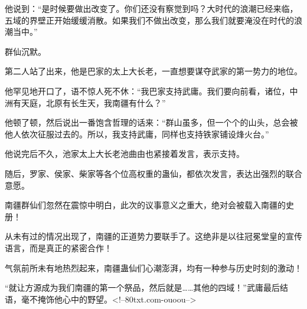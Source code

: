 \begin{this_body}
他说到：“是时候要做出改变了。你们还没有察觉到吗？大时代的浪潮已经来临，五域的界壁正开始缓缓消散。如果我们不做出改变，那么我们就要淹没在时代的浪潮当中。”

群仙沉默。

第二人站了出来，他是巴家的太上大长老，一直想要谋夺武家的第一势力的地位。

他罕见地开口了，语不惊人死不休：“我巴家支持武庸。我们要向前看，诸位，中洲有天庭，北原有长生天，我南疆有什么？”

他顿了顿，然后说出一番饱含哲理的话来：“群山虽多，但一个个的山头，总会被他人依次征服过去的。所以，我支持武庸，同样也支持铁家铺设烽火台。”

他说完后不久，池家太上大长老池曲由也紧接着发言，表示支持。

随后，罗家、侯家、柴家等各个位高权重的蛊仙，都依次发言，表达出强烈的联合意愿。

南疆群仙们忽然在震惊中明白，此次的议事意义之重大，绝对会被载入南疆的史册！

从未有过的情况出现了，南疆的正道势力要联手了。这绝非是以往冠冕堂皇的宣传语言，而是真正的紧密合作！

气氛前所未有地热烈起来，南疆蛊仙们心潮澎湃，均有一种参与历史时刻的激动！

“就让方源成为我们南疆的第一个祭品，然后就是……其他的四域！”武庸最后结语，毫不掩饰他心中的野望。<!--80txt.com-ouoou-->

\end{this_body}

